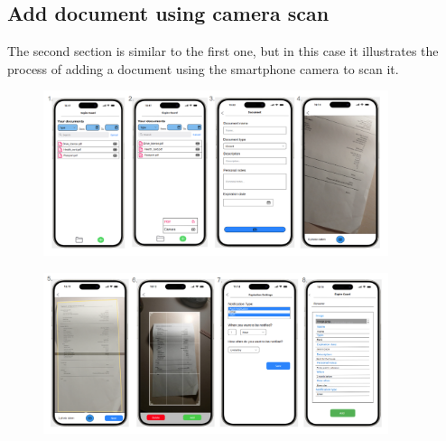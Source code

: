 	\subsection{Add document using camera scan}
		The second section is similar to the first one, but in this case it illustrates the process of adding a document using the smartphone camera to scan it.
		\begin{figure}[htbp]
			\centering
			\includegraphics[width=0.9\textwidth]{../mockups/add_doc_cam_1.png}  %
		\end{figure}

		\begin{figure}[htbp]
			\centering
			\includegraphics[width=0.9\textwidth]{../mockups/add_doc_cam_2.png}  %
		\end{figure}
		\clearpage
